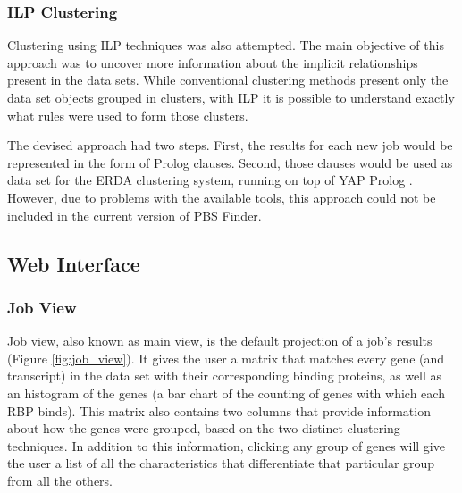 \subsubsection*{ILP Clustering}

Clustering using ILP techniques was also attempted. The main objective of this
approach was to uncover more information about the implicit relationships
present in the data sets. While conventional clustering methods present only the
data set objects grouped in clusters, with ILP it is possible to understand
exactly what rules were used to form those clusters.

The devised approach had two steps. First, the results for each new job would be
represented in the form of Prolog clauses. Second, those clauses would be used
as data set for the ERDA \cite{fonseca2012conceptual} clustering system, running
on top of YAP Prolog \cite{citeulike:8884858}. However, due to problems with the
available tools, this approach could not be included in the current version of
PBS Finder.

\subsection{Web Interface}


\subsubsection*{Job View}

Job view, also known as main view, is the default projection of a job's results
(Figure \ref{fig:job_view}). It gives the user a matrix that matches every gene (and
transcript) in the data set with their corresponding binding proteins, as well
as an histogram of the genes (a bar chart of the counting of genes with which
each RBP binds). This matrix also contains two columns that provide information
about how the genes were grouped, based on the two distinct clustering
techniques. In addition to this information,
clicking any group of genes will give the user a list of all the characteristics
that differentiate that particular group from all the others.

